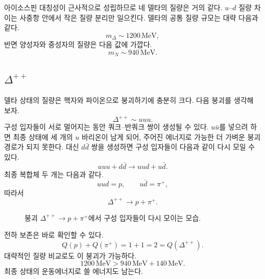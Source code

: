 아이소스핀 대칭성이 근사적으로 성립하므로 네 델타의 질량은 거의 같다. \(u\)--\(d\) 질량 차이는 사중항 안에서 작은 질량 분리만 일으킨다. 델타의 공통 질량 규모는 대략 다음과 같다.
\begin{equation}
m_\Delta\sim1200\,\mathrm{MeV},
\end{equation}
반면 양성자와 중성자의 질량은 다음 값에 가깝다.
\begin{equation}
m_N\sim940\,\mathrm{MeV}.
\end{equation}

\subsection{\texorpdfstring{\(\Delta^{++}\)}{의 붕괴}}

델타 상태의 질량은 핵자와 파이온으로 붕괴하기에 충분히 크다. 다음 붕괴를 생각해 보자.
\begin{equation}
\Delta^{++}\sim uuu.
\end{equation}
구성 입자들이 서로 멀어지는 동안 쿼크--반쿼크 쌍이 생성될 수 있다. \(u\bar u\)를 넣으려 하면 최종 상태에 세 개의 \(u\) 바리온이 남게 되어, 주어진 에너지로 가능한 더 가벼운 붕괴 경로가 되지 못한다. 대신 \(d\bar d\) 쌍을 생성하면 구성 입자들이 다음과 같이 다시 모일 수 있다.
\begin{equation}
uuu+d\bar d
\longrightarrow
uud+u\bar d.
\end{equation}
최종 복합체 두 개는 다음과 같다.
\begin{equation}
uud=p,
\qquad
u\bar d=\pi^+,
\end{equation}
따라서
\begin{equation}
\Delta^{++}\longrightarrow p+\pi^+.
\end{equation}

\begin{figure}[h]
\centering
{}
\caption{붕괴 \(\Delta^{++}\rightarrow p+\pi^+\)에서 구성 입자들이 다시 모이는 모습.}
\end{figure}

전하 보존은 바로 확인할 수 있다.
\begin{equation}
Q(p)+Q(\pi^+)=1+1=2=Q(\Delta^{++}).
\end{equation}
대략적인 질량 비교로도 이 붕괴가 가능하다.
\begin{equation}
1200\,\mathrm{MeV}
>
940\,\mathrm{MeV}+140\,\mathrm{MeV}.
\end{equation}
최종 상태의 운동에너지로 쓸 에너지도 남는다.

